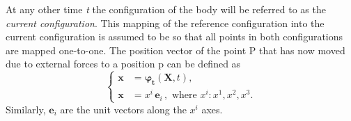 At any other time \emph{t} the configuration of the body will be referred to as the \emph{current configuration}.
 This mapping of the reference configuration into the current configuration is assumed to be so that all points in
 both configurations are mapped one-to-one. The position vector of the point $\mathrm{P}$
 that has now moved due to external forces to a position $\mathrm{p}$ can be defined as
\begin{equation} \label{curr_config_definition}
    \begin{cases}
        \boldsymbol{{x}} &= \boldsymbol{\varphi_{t}}(\boldsymbol{X}, t), \\
        \boldsymbol{{x}} &= {x}^{i} \, \boldsymbol{{e}}_{{i}}\, , \, \, \text{where } {x}^{i}: {x}^{1}, {x}^{2}, {x}^{3}.
    \end{cases}
\end{equation}
Similarly, $\boldsymbol{{e}}_{{i}}$ are the unit vectors
 along the ${x}^{i}$ axes.

